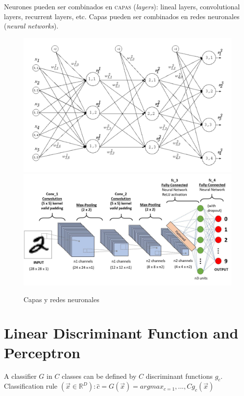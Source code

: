 Neurones pueden ser combinados en \textsc{capas} (\textit{layers}): lineal layers, convolutional layers, recurrent layers, etc.
Capas pueden ser combinados en redes neuronales (\textit{neural networks}).

\begin{figure}[htbp]
   \centering
   \includegraphics{images/08/layers1.png}
   \includegraphics{images/08/layers2.jpeg}
   \caption{Capas y redes neuronales}
   \label{fig:08/layers}
\end{figure}

\newpage
\section{Linear Discriminant Function and Perceptron}

A classifier $G$ in $C$ classes can be defined by $C$ discriminant functions $g_c$.\\
Classification rule $(\vec{x} \in \mathbb{R}^D ): \hat{c} = G(\vec{x}) = arg max_{c=1},...,C g_c (\vec{x})$

